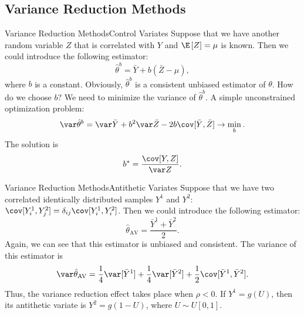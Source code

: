 \subsection{Variance Reduction Methods}
    \begin{frame}{Variance Reduction Methods}{Control Variates}
        Suppose that we have another random variable $Z$ that is correlated with $Y$ and 
        $\E\left[Z\right] = \mu$ is known. Then we could introduce the following estimator:
        \begin{equation}
            \hat\theta^b = \bar Y + b(\bar Z - \mu),
        \end{equation}
        where $b$ is a constant. Obviously, $\hat\theta^b$ is a consistent unbiased estimator of 
        $\theta$. How do we choose $b$? We need to minimize the variance of $\hat\theta^b$. A simple 
        unconstrained optimization problem:
        \begin{equation*}
            \var \hat\theta^b = \var \bar Y + b^2 \var \bar Z - 2b \cov [\bar Y, \bar Z] \to \min_b.
        \end{equation*}
        The solution is
        \begin{equation}
            b^* = \frac{\cov [Y, Z]}{\var Z}.\label{eq:control_variates:bopt}
        \end{equation}
    \end{frame}

    \begin{frame}{Variance Reduction Methods}{Antithetic Variates}
        Suppose that we have two correlated identically distributed samples $Y^1$ and $Y^2$: $\cov[Y_i^1, Y_j^2] = \delta_{ij}\cov[Y_i^1, Y_i^2]$.
        Then we could introduce the following estimator:
        \begin{equation}
            \hat\theta_{\operatorname{AV}} = \frac{\bar Y^1 + \bar Y^2}{2}.
        \end{equation}
        Again, we can see that this estimator is unbiased and consistent. The variance of this estimator is
        \begin{equation*}
            \var \hat\theta_{\operatorname{AV}} = \frac{1}{4} \var[\bar Y^1] + \frac{1}{4} \var[\bar Y^2] + \frac{1}{2} \cov[\bar Y^1, \bar Y^2] .
        \end{equation*}
        Thus, the variance reduction effect takes place when $\rho < 0$. If $Y^1 = g(U)$, then its antithetic 
        variate is $Y^2 = g(1-U)$, where $U \sim U[0, 1]$. 
    \end{frame}